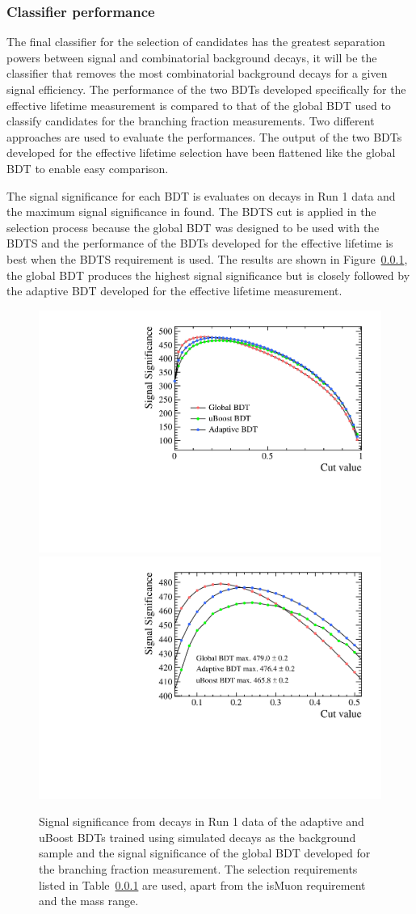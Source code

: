 \subsubsection{Classifier performance}

The final classifier for the selection of \bsmumu candidates has the greatest separation powers between signal and combinatorial background decays, it will be the classifier that removes the most combinatorial background decays for a given signal efficiency. The performance of the two BDTs developed specifically for the effective lifetime measurement is compared to that of the global BDT used to classify candidates for the branching fraction measurements. Two different approaches are used to evaluate the performances. The output of the two BDTs developed for the effective lifetime selection have been flattened like the global BDT to enable easy comparison.

The signal significance for each BDT is evaluates on \bhh decays in Run 1 data and the maximum signal significance in found. The BDTS cut is applied in the selection process because the global BDT was designed to be used with the BDTS and the performance of the BDTs developed for the effective lifetime is best when the BDTS requirement is used. The results are shown in Figure~\ref{}, the global BDT produces the highest signal significance but is closely followed by the adaptive BDT developed for the effective lifetime measurement. 

\begin{figure}[htbp]
    \centering
        \includegraphics[width=0.49 \textwidth]{./Figs/Selection/BDT_comp_full_range.pdf}
        \includegraphics[width=0.49 \textwidth]{./Figs/Selection/BDT_comp_zoom.pdf}
    \caption{Signal significance from \bhh decays in Run 1 data of the adaptive and uBoost BDTs trained using simulated decays as the background sample and the signal significance of the global BDT developed for the branching fraction measurement. The selection requirements listed in Table~\ref{} are used, apart from the isMuon requirement and the mass range. }
    \label{fig:SSall}
\end{figure}



